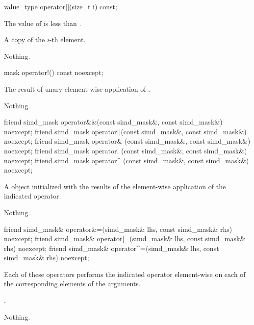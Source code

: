 \begin{itemdecl}
value_type operator[](size_t i) const;
\end{itemdecl}
\begin{itemdescr}
  \pnum\requires The value of  is less than .

  \pnum\returns A copy of the $i$-th element.

  \pnum\throws Nothing.
\end{itemdescr}

\begin{itemdecl}
mask operator!() const noexcept;
\end{itemdecl}
\begin{itemdescr}
  \pnum\returns The result of unary element-wise application of .

  \pnum\throws Nothing.
\end{itemdescr}


\begin{itemdecl}
friend simd_mask operator&&(const simd_mask&, const simd_mask&) noexcept;
friend simd_mask operator||(const simd_mask&, const simd_mask&) noexcept;
friend simd_mask operator& (const simd_mask&, const simd_mask&) noexcept;
friend simd_mask operator| (const simd_mask&, const simd_mask&) noexcept;
friend simd_mask operator^ (const simd_mask&, const simd_mask&) noexcept;
\end{itemdecl}
\begin{itemdescr}
  \pnum\returns A \mask object initialized with the results of the element-wise application of the indicated operator.

  \pnum\throws Nothing.
\end{itemdescr}

\begin{itemdecl}
friend simd_mask& operator&=(simd_mask& lhs, const simd_mask& rhs) noexcept;
friend simd_mask& operator|=(simd_mask& lhs, const simd_mask& rhs) noexcept;
friend simd_mask& operator^=(simd_mask& lhs, const simd_mask& rhs) noexcept;
\end{itemdecl}
\begin{itemdescr}
  \pnum\effects Each of these operators performs the indicated operator element-wise on each of the corresponding elements of the arguments.

  \pnum\returns {}.

  \pnum\throws Nothing.
\end{itemdescr}

